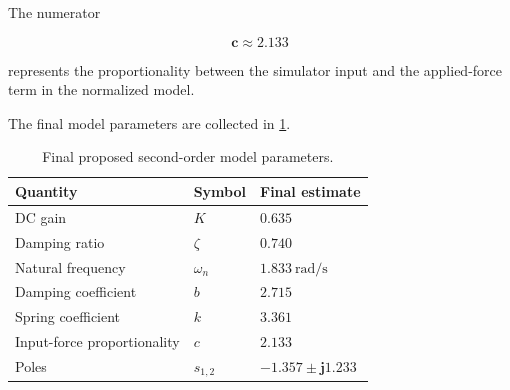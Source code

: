 \documentclass[12pt,a4paper]{article}
\begin{document}
The numerator

\begin{equation}
    \boldsymbol{c\approx2.133}
    \tag{43}
\end{equation}

represents the proportionality between the simulator input and the
applied-force term in the normalized model.

The final model parameters are collected in
\cref{tab:finalparams}.

\begin{table}[H]
    \centering
    \caption{Final proposed second-order model parameters.}
    \label{tab:finalparams}

    \renewcommand{\arraystretch}{1.35}

    \begin{tabular}{
        |>{\raggedright\arraybackslash}p{}
        |>{\centering\arraybackslash}p{}
        |>{\centering\arraybackslash}p{}|
    }
        \hline

        \rowcolor{gray!15}
        \textbf{Quantity} &
        \textbf{Symbol} &
        \textbf{Final estimate} \\

        \hline

        DC gain &
        $K$ &
        $\mathbf{0.635}$ \\

        \hline

        Damping ratio &
        $\zeta$ &
        $\mathbf{0.740}$ \\

        \hline

        Natural frequency &
        $\omega_n$ &
        $\mathbf{1.833}~\mathrm{rad/s}$ \\

        \hline

        Damping coefficient &
        $b$ &
        $\mathbf{2.715}$ \\

        \hline

        Spring coefficient &
        $k$ &
        $\mathbf{3.361}$ \\

        \hline

        Input-force proportionality &
        $c$ &
        $\mathbf{2.133}$ \\

        \hline

        Poles &
        $s_{1,2}$ &
        $\mathbf{-1.357\pm j1.233}$ \\

        \hline
    \end{tabular}
\end{table}
\end{document}
